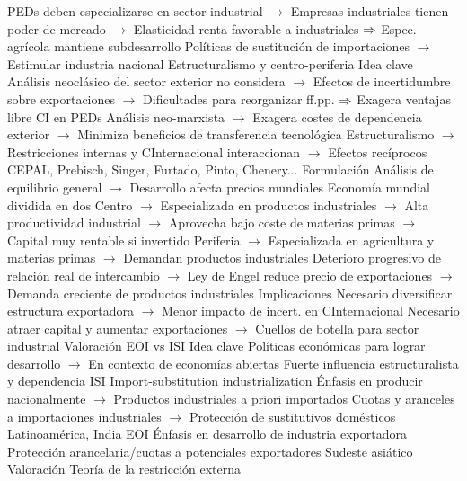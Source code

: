 \documentclass{nuevotema}
\begin{document}
\begin{esquemal}
				\4[] PEDs deben especializarse en sector industrial
				\4[] $\to$ Empresas industriales tienen poder de mercado
				\4[] $\to$ Elasticidad-renta favorable a industriales
				\4[] $\Rightarrow$ Espec. agrícola mantiene subdesarrollo
				\4[] Políticas de sustitución de importaciones
				\4[] $\to$ Estimular industria nacional
			\3 Estructuralismo y centro-periferia
				\4 Idea clave
				\4[] Análisis neoclásico del sector exterior no considera
				\4[] $\to$ Efectos de incertidumbre sobre exportaciones
				\4[] $\to$ Dificultades para reorganizar ff.pp.
				\4[] $\Rightarrow$ Exagera ventajas libre CI en PEDs
				\4[] Análisis neo-marxista
				\4[] $\to$ Exagera costes de dependencia exterior
				\4[] $\to$ Minimiza beneficios de transferencia tecnológica
				\4[] Estructuralismo
				\4[] $\to$ Restricciones internas y CInternacional interaccionan
				\4[] $\to$ Efectos recíprocos
				\4[] CEPAL, Prebisch, Singer, Furtado, Pinto, Chenery...
				\4 Formulación
				\4[] Análisis de equilibrio general
				\4[] $\to$ Desarrollo afecta precios mundiales
				\4[] Economía mundial dividida en dos
				\4[] Centro
				\4[] $\to$ Especializada en productos industriales
				\4[] $\to$ Alta productividad industrial
				\4[] $\to$ Aprovecha bajo coste de materias primas
				\4[] $\to$ Capital muy rentable si invertido
				\4[] Periferia
				\4[] $\to$ Especializada en agricultura y materias primas
				\4[] $\to$ Demandan productos industriales
				\4[] Deterioro progresivo de relación real de intercambio
				\4[] $\to$ Ley de Engel reduce precio de exportaciones
				\4[] $\to$ Demanda creciente de productos industriales
				\4 Implicaciones
				\4[] Necesario diversificar estructura exportadora
				\4[] $\to$ Menor impacto de incert. en CInternacional
				\4[] Necesario atraer capital y aumentar exportaciones
				\4[] $\to$ Cuellos de botella para sector industrial
				\4 Valoración
			\3 EOI vs ISI
				\4 Idea clave
				\4[] Políticas económicas para lograr desarrollo
				\4[] $\to$ En contexto de economías abiertas
				\4[] Fuerte influencia estructuralista y dependencia
				\4 ISI
				\4[] Import-substitution industrialization
				\4[] Énfasis en producir nacionalmente
				\4[] $\to$ Productos industriales a priori importados
				\4[] Cuotas y aranceles a importaciones industriales
				\4[] $\to$ Protección de sustitutivos domésticos
				\4[] Latinoamérica, India
				\4 EOI
				\4[] Énfasis en desarrollo de industria exportadora
				\4[] Protección arancelaria/cuotas a potenciales exportadores
				\4[] Sudeste asiático
				\4 Valoración
			\3 Teoría de la restricción externa

\end{esquemal}
\end{document}
